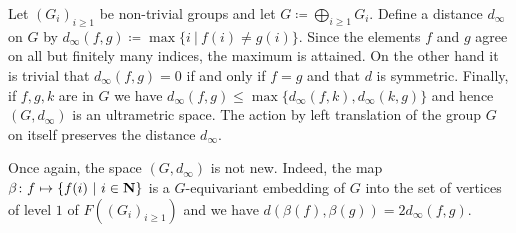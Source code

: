 \begin{exmp}\label{Expl:Ultra}
Let $(G_i)_{i\geq 1}$ be non-trivial groups and let $G\coloneqq\bigoplus_{i\geq 1}G_i$.
Define a distance $d_\infty$ on $G$ by $d_\infty(f,g)\coloneqq\max\{i\ |\ f(i)\neq g(i)\}$.
Since the elements $f$ and $g$ agree on all but finitely many indices, the maximum is attained. On the other hand it is trivial that $d_\infty(f,g)=0$ if and only if $f=g$ and that $d$ is symmetric.
Finally, if $f,g,k$ are in $G$ we have $d_\infty(f,g)\leq\max\{d_\infty(f,k),d_\infty(k,g)\}$ and hence $(G,d_\infty)$ is an ultrametric space.
The action by left translation of the group $G$  on itself preserves the distance $d_\infty$.
\end{exmp}
Once again, the space $(G,d_\infty)$ is not new.
Indeed, the map $\beta\colon f\mapsto \{f(i)\ |\ i\in\mathbf{N}\}$ is a $G$-equivariant embedding of $G$ into the set of vertices of level $1$ of $F((G_i)_{i\geq 1})$ and we have $d(\beta(f),\beta(g))=2d_\infty(f,g)$.

